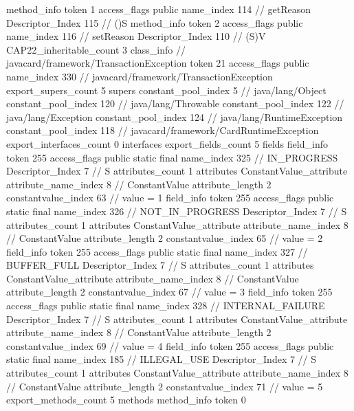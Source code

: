 {{{{{				}
				method_info {
					token	1
					access_flags	public
					name_index	114		// getReason
					Descriptor_Index	115		// ()S
				}
				method_info {
					token	2
					access_flags	public
					name_index	116		// setReason
					Descriptor_Index	110		// (S)V
				}
			}
			CAP22_inheritable_count	3
		}
		class_info {		// javacard/framework/TransactionException
			token	21
			access_flags	public
			name_index	330		// javacard/framework/TransactionException
			export_supers_count	5
			supers {
				constant_pool_index	5		// java/lang/Object
				constant_pool_index	120		// java/lang/Throwable
				constant_pool_index	122		// java/lang/Exception
				constant_pool_index	124		// java/lang/RuntimeException
				constant_pool_index	118		// javacard/framework/CardRuntimeException
			}
			export_interfaces_count	0
			interfaces {
			}
			export_fields_count	5
			fields {
			field_info {
				token	255
				access_flags	public static final
				name_index	325		// IN_PROGRESS
				Descriptor_Index	7		// S
				attributes_count	1
				attributes {
				ConstantValue_attribute {
					attribute_name_index	8		// ConstantValue
					attribute_length	2
					constantvalue_index	63		// value = 1
				}
				}
			}
			field_info {
				token	255
				access_flags	public static final
				name_index	326		// NOT_IN_PROGRESS
				Descriptor_Index	7		// S
				attributes_count	1
				attributes {
				ConstantValue_attribute {
					attribute_name_index	8		// ConstantValue
					attribute_length	2
					constantvalue_index	65		// value = 2
				}
				}
			}
			field_info {
				token	255
				access_flags	public static final
				name_index	327		// BUFFER_FULL
				Descriptor_Index	7		// S
				attributes_count	1
				attributes {
				ConstantValue_attribute {
					attribute_name_index	8		// ConstantValue
					attribute_length	2
					constantvalue_index	67		// value = 3
				}
				}
			}
			field_info {
				token	255
				access_flags	public static final
				name_index	328		// INTERNAL_FAILURE
				Descriptor_Index	7		// S
				attributes_count	1
				attributes {
				ConstantValue_attribute {
					attribute_name_index	8		// ConstantValue
					attribute_length	2
					constantvalue_index	69		// value = 4
				}
				}
			}
			field_info {
				token	255
				access_flags	public static final
				name_index	185		// ILLEGAL_USE
				Descriptor_Index	7		// S
				attributes_count	1
				attributes {
				ConstantValue_attribute {
					attribute_name_index	8		// ConstantValue
					attribute_length	2
					constantvalue_index	71		// value = 5
				}
				}
			}
			}
			export_methods_count	5
			methods {
				method_info {
					token	0
}}}}}
